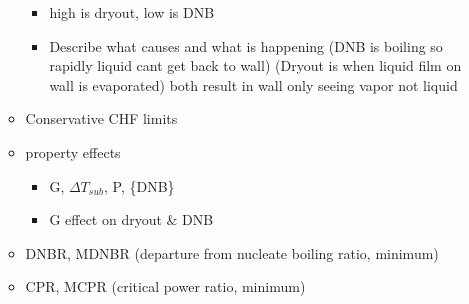 \documentclass{article}
\begin{document}
\begin{enumerate}
\begin{itemize}
\begin{itemize}
            \item high is dryout, low is DNB
            \item Describe what causes and what is happening (DNB is boiling so rapidly liquid cant get back to wall) (Dryout is when liquid film on wall is evaporated) both result in wall only seeing vapor not liquid
        \end{itemize}
        \item Conservative CHF limits
        \item property effects
        \begin{itemize}
            \item G, $\Delta T_{sub}$, P, \{DNB\}
            \item G effect on dryout \& DNB
        \end{itemize}
        \item DNBR, MDNBR (departure from nucleate boiling ratio, minimum)
        \item CPR, MCPR (critical power ratio, minimum)
    \end{itemize}
\end{enumerate}
\end{document}
